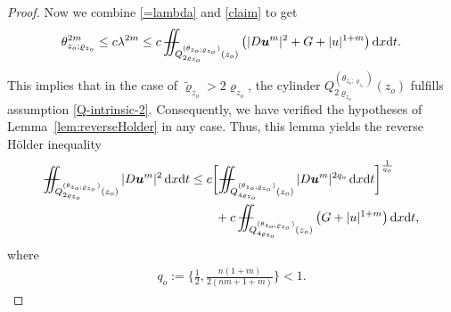 \documentclass[a4paper, 10pt, american]{amsart}
\numberwithin{theorem}{section}
\numberwithin{equation}{section}
\newcommand{\dxdt}{\,\mathrm{d}x\mathrm{d}t}
\renewcommand{\rho}{\varrho}
\newcommand{\power}[2]{\bm{#1^{\mbox{\unboldmath{\scriptsize$#2$}}}}}
\def\Xiint#1{\mathchoice
    {\XXiint\displaystyle\textstyle{#1}}%
    {\XXiint\textstyle\scriptstyle{#1}}%
    {\XXiint\scriptstyle\scriptscriptstyle{#1}}%
    {\XXiint\scriptscriptstyle\scriptscriptstyle{#1}}%
    \!\iint}
\def\XXiint#1#2#3{\setbox0=\hbox{$#1{#2#3}{\iint}$}
    \vcenter{\hbox{$#2#3$}}\kern-0.5\wd0}
\def\biint{\Xiint{-\!-}}
\def\Tilde{\widetilde}
\begin{document}
\begin{proof}
Now we combine \eqref{=lambda} and \eqref{claim} to get
\begin{align}
\theta_{z_o;\rho_{z_o}}^{2m}
\le c\lambda^{2m}
\le
c\,\biint_{Q_{2\rho_{z_o}}^{(\theta_{z_o;\rho_{z_o}})}(z_o)}\big( |D\power um|^2 +G + |u|^{1+m} \big)\dxdt.
\end{align}
This implies that in the case of $\Tilde\rho_{z_o}>2\rho_{z_o}$, the cylinder $Q_{2\rho_{z_o}}^{(\theta_{z_o;\rho_{z_o}})}(z_o)$ fulfills assumption \eqref{Q-intrinsic-2}.
Consequently, we have verified the hypotheses of Lemma~\ref{lem:reverseHolder} in any case. Thus, this lemma yields the reverse H\"older inequality
\begin{align}\label{reverseHolder}
\nonumber
\biint_{Q_{2\rho_{z_o}}^{(\theta_{z_o;\rho_{z_o}})}(z_o)}|D\power um|^2\dxdt
&\le
c\bigg[\biint_{Q_{4\rho_{z_o}}^{(\theta_{z_o;\rho_{z_o}})}(z_o)} |D\power um|^{2q_o} \dxdt\bigg]^\frac1{q_o}\\
&\qquad+
c\,\biint_{Q_{4\rho_{z_o}}^{(\theta_{z_o;\rho_{z_o}})}(z_o)}\big(G+|u|^{1+m}\big)\dxdt,
\end{align}
where 
\begin{align*}
q_o:=\bigg\{\frac12,\frac{n(1+m)}{2(nm+1+m)}\bigg\}<1.
\end{align*}






\end{proof}
\end{document}
